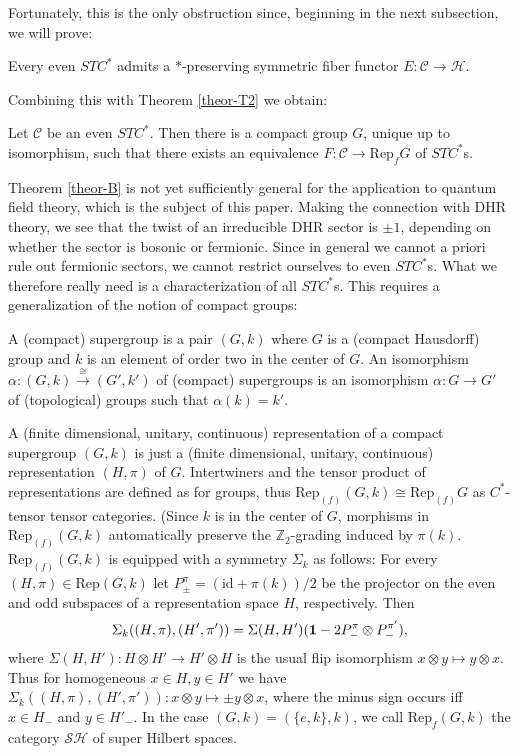 \documentclass[12pt]{article}
\theoremstyle{definition}
\theoremstyle{definition}
\theoremstyle{remark}
\def\2#1{{\mathcal #1}}
\def\7#1{{\mathbb #1}}
\def\1#1{{\bf #1}}
\newcommand{\Rep}{\mathrm{Rep}}
\newcommand{\rarr}{\rightarrow}
\def\id{\mathrm{id}}
\begin{document}
Fortunately, this is the only obstruction since, beginning in the next subsection, we will prove:

\btheor \label{theor-C} 
Every even $STC^*$ admits a $*$-preserving symmetric fiber functor $E: \2C\rarr\2H$. 
\etheor

Combining this with Theorem \ref{theor-T2} we obtain:

\btheor \label{theor-B}
Let $\2C$ be an even $STC^*$. Then there is a compact group $G$, unique up to isomorphism, such that
there exists an equivalence $F: \2C\rarr\Rep_fG$ of $STC^*$s. 
\etheor

Theorem \ref{theor-B} is not yet sufficiently general for the application to quantum field theory,
which is the subject of this paper. Making the connection with DHR theory, we see that the twist of
an irreducible DHR sector is $\pm 1$, depending on whether the sector is bosonic or fermionic. Since
in general we cannot a priori rule out fermionic sectors, we cannot restrict ourselves to even
$STC^*$s. What we therefore really need is a characterization of all $STC^*$s. This requires a
generalization of the notion of compact groups: 

\bdefin {}
A (compact) supergroup is a pair $(G,k)$ where $G$ is a (compact Hausdorff) group and $k$ is an
element of order two in the center of $G$. An isomorphism
$\alpha:(G,k)\stackrel{\cong}{\rarr}(G',k')$ of (compact) supergroups is an isomorphism $\alpha:G\rarr G'$
of (topological) groups such that $\alpha(k)=k'$.
\edefin

\bdefin {}
A (finite dimensional, unitary, continuous) representation of a compact supergroup $(G,k)$
is just a (finite dimensional, unitary, continuous) representation $(H,\pi)$ of $G$. 
Intertwiners and the tensor product of representations are defined as for groups, thus
$\Rep_{(f)}(G,k)\cong\Rep_{(f)}G$ as $C^*$-tensor tensor categories. (Since $k$ is in the center of
$G$, morphisms in $\Rep_{(f)}(G,k)$ automatically preserve the $\7Z_2$-grading induced by $\pi(k)$.
$\Rep_{(f)}(G,k)$ is equipped with a symmetry $\Sigma_k$ as follows: For every $(H,\pi)\in\Rep(G,k)$
let $P_\pm^\pi=(\id+\pi(k))/2$ be the projector on the even and odd subspaces of a representation
space $H$, respectively. Then 
\[ \Sigma_k((H,\pi),(H',\pi'))= \Sigma(H,H')(\11 - 2 P_-^\pi\otimes P_-^{\pi'}), \]
where $\Sigma(H,H'): H\otimes H'\rarr H'\otimes H$ is the usual flip isomorphism 
$x\otimes y\mapsto y\otimes x$. Thus for homogeneous $x\in H, y\in H'$ we have
$\Sigma_k((H,\pi),(H',\pi')): x\otimes y\mapsto\pm y\otimes x$, where the minus sign occurs iff
$x\in H_-$ and $y\in H'_-$. In the case $(G,k)=(\{e,k\},k)$, we call $\Rep_f(G,k)$ the category
$\2S\2H$ of super Hilbert spaces.
\edefin
\end{document}
